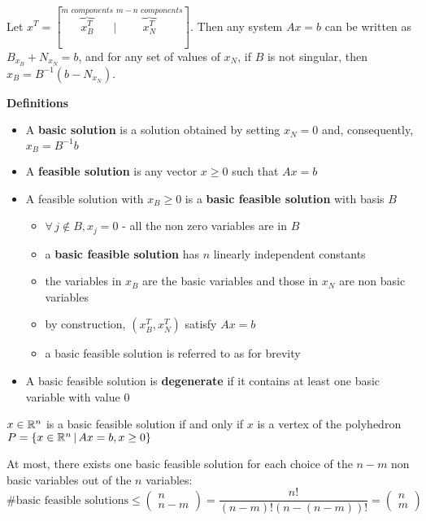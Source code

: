 \documentclass[english]{article}
\begin{document}
Let \(x^T = [ \overbrace{x_B^T}^{m\textit{ components}} |  \overbrace{x_N^T}^{m-n \textit{ components}}]\).
Then any system \(Ax = b\) can be written as \(B _{x_B} + N_{x_N} = b\), and for any set of values of \(x_N\), if \(B\) is not singular, then \(x_B = B^{-1} (b - N_{x_N})\).

\bigskip
\textbf{Definitions}
\begin{itemize}
  \item A \textbf{basic solution} is a solution obtained by setting \(x_N = 0\) and, consequently, \(x_B = B^{-1} b\)
  \item A \textbf{feasible solution} is any vector \(x \geq 0\) such that \(Ax = b\)
  \item A feasible solution with \(x_B \geq 0\) is a \textbf{basic feasible solution} with basis \(B\)
        \begin{itemize}
          \item \(\forall \, j \notin B, x_j = 0\) - all the non zero variables are in \(B\)
          \item a \textbf{basic feasible solution} has \(n\) linearly independent constants
          \item the variables in \(x_B\) are the basic variables and those in \(x_N\) are non basic variables
          \item by construction, \(\left( x_B^T, x_N^T \right)\) satisfy \(Ax = b\)
          \item a basic feasible solution is referred to as \BFS for brevity
        \end{itemize}
  \item A basic feasible solution is \textbf{degenerate} if it contains at least one basic variable with value \(0\)
\end{itemize}

\bigskip
\begin{theorem}
  \(x \in \mathbb{R}^n\) is a basic feasible solution if and only if \(x\) is a vertex of the polyhedron \(P = \left\{ x \in \mathbb{R}^n \, | \, Ax = b, x \geq 0 \right\}\)
\end{theorem}

\bigskip
\begin{property}
  At most, there exists one basic feasible solution for each choice of the \(n-m\) non basic variables out of the \(n\) variables:
  \[\text{\# basic feasible solutions} \leq
    \begin{pmatrix}
      n \\ n-m
    \end{pmatrix}
    = \dfrac{n!}{\left( n - m \right)! \left( n - \left( n-m \right) \right)!} =
    \begin{pmatrix}
      n \\ m
    \end{pmatrix}
  \]
\end{property}
\end{document}
